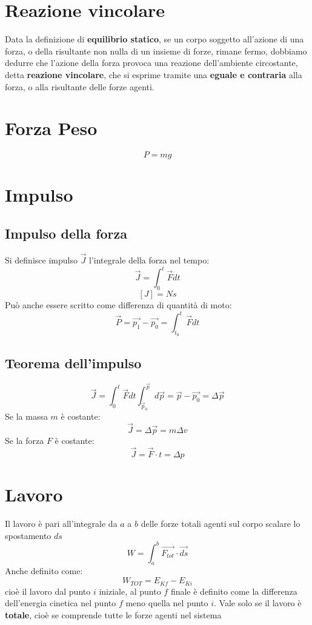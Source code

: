 \documentclass[a4paper]{report}
\begin{document}
  \section{Reazione vincolare}
  Data la definizione di \textbf{equilibrio statico}, se un corpo soggetto all'azione di una forza, o della risultante non nulla di un insieme di forze, rimane fermo, dobbiamo dedurre che l'azione della forza provoca una reazione dell'ambiente circostante, detta \textbf{reazione vincolare}, che si esprime tramite una \textbf{eguale e contraria} alla forza, o alla risultante delle forze agenti.

  \section{Forza Peso}
  \[ P = mg \]

  \section{Impulso}
  \subsection{Impulso della forza}
  Si definisce impulso $ \vec{J} $ l'integrale della forza nel tempo:
  \[ \vec{J} = \int_0^t \vec{F} dt \]
  \[ [J] = N  s \]
  Può anche essere scritto come differenza di quantità di moto:
  \[\vec{P} = \vec{p_1} - \vec{p_0} = \int_{t_0}^t \vec{F} dt \]

  \subsection{Teorema dell'impulso}
  \[ \vec{J} = \int_0^t \vec{F} dt \int_{\vec{p}_0}^{\vec{p}} d\vec{p} = \vec{p} - \vec{p_0} = \Delta \vec{p} \]
  Se la massa $m$ è costante:
  \[ \vec{J} = \Delta \vec{p} = m \Delta v \]
  Se la forza $F$ è costante:
  \[ \vec{J} = \vec{F} \cdot t = \Delta p  \]

  \section{Lavoro}
  Il lavoro è pari all'integrale da $a$ a $b$ delle forze totali agenti sul corpo scalare lo spostamento $ds$
  \[ W = \int_{a}^{b} \vec{F_{tot}} \cdot \vec{ds} \]
  Anche definito come:
  \[ W_{TOT} = E_{Kf} - E_{Ki} \]
  cioè il lavoro dal punto $i$ iniziale, al punto $f$ finale è definito come la differenza dell'energia cinetica nel punto $f$ meno quella nel punto $i$. Vale solo se il lavoro è \textbf{totale}, cioè se comprende tutte le forze agenti nel sistema
\end{document}
